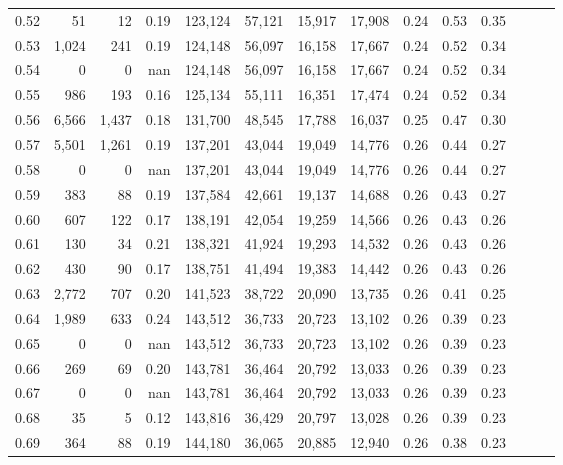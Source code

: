 \begin{tabular}{rrrrrrrrrrrrrr}
0.52 &      51 &     12 &  0.19 &  123,124 &   57,121 &  15,917 &  17,908 &  0.24 &  0.53 &      0.35 \\
0.53 &   1,024 &    241 &  0.19 &  124,148 &   56,097 &  16,158 &  17,667 &  0.24 &  0.52 &      0.34 \\
0.54 &       0 &      0 &   nan &  124,148 &   56,097 &  16,158 &  17,667 &  0.24 &  0.52 &      0.34 \\
0.55 &     986 &    193 &  0.16 &  125,134 &   55,111 &  16,351 &  17,474 &  0.24 &  0.52 &      0.34 \\
0.56 &   6,566 &  1,437 &  0.18 &  131,700 &   48,545 &  17,788 &  16,037 &  0.25 &  0.47 &      0.30 \\
0.57 &   5,501 &  1,261 &  0.19 &  137,201 &   43,044 &  19,049 &  14,776 &  0.26 &  0.44 &      0.27 \\
0.58 &       0 &      0 &   nan &  137,201 &   43,044 &  19,049 &  14,776 &  0.26 &  0.44 &      0.27 \\
0.59 &     383 &     88 &  0.19 &  137,584 &   42,661 &  19,137 &  14,688 &  0.26 &  0.43 &      0.27 \\
0.60 &     607 &    122 &  0.17 &  138,191 &   42,054 &  19,259 &  14,566 &  0.26 &  0.43 &      0.26 \\
0.61 &     130 &     34 &  0.21 &  138,321 &   41,924 &  19,293 &  14,532 &  0.26 &  0.43 &      0.26 \\
0.62 &     430 &     90 &  0.17 &  138,751 &   41,494 &  19,383 &  14,442 &  0.26 &  0.43 &      0.26 \\
0.63 &   2,772 &    707 &  0.20 &  141,523 &   38,722 &  20,090 &  13,735 &  0.26 &  0.41 &      0.25 \\
0.64 &   1,989 &    633 &  0.24 &  143,512 &   36,733 &  20,723 &  13,102 &  0.26 &  0.39 &      0.23 \\
0.65 &       0 &      0 &   nan &  143,512 &   36,733 &  20,723 &  13,102 &  0.26 &  0.39 &      0.23 \\
0.66 &     269 &     69 &  0.20 &  143,781 &   36,464 &  20,792 &  13,033 &  0.26 &  0.39 &      0.23 \\
0.67 &       0 &      0 &   nan &  143,781 &   36,464 &  20,792 &  13,033 &  0.26 &  0.39 &      0.23 \\
0.68 &      35 &      5 &  0.12 &  143,816 &   36,429 &  20,797 &  13,028 &  0.26 &  0.39 &      0.23 \\
0.69 &     364 &     88 &  0.19 &  144,180 &   36,065 &  20,885 &  12,940 &  0.26 &  0.38 &      0.23 \\

\end{tabular}
